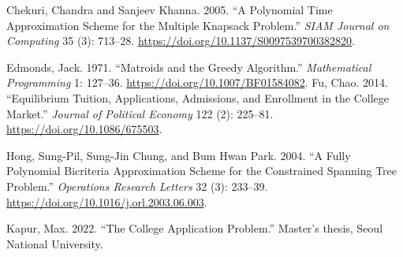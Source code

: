 \documentclass[11pt]{article} %
\theoremstyle{definition}
\begin{document}
Chekuri, Chandra and Sanjeev Khanna. 2005. ``A Polynomial Time Approximation Scheme for the Multiple Knapsack Problem.'' \emph{SIAM Journal on Computing} 35 (3): 713--28. \url{https://doi.org/10.1137/S0097539700382820}.

%
%
%
Edmonds, Jack. 1971. ``Matroids and the Greedy Algorithm.'' \emph{Mathematical Programming} 1: 127--36. \url{https://doi.org/10.1007/BF01584082}.  
%
%
%
Fu, Chao. 2014. ``Equilibrium Tuition, Applications, Admissions, and Enrollment in the College Market.'' \emph{Journal of Political Economy} 122 (2): 225--81. \url{https://doi.org/10.1086/675503}. 

%
%
%
Hong, Sung-Pil, Sung-Jin Chung, and Bum Hwan Park. 2004. ``A Fully Polynomial Bicriteria Approximation Scheme for the Constrained Spanning Tree Problem.'' \emph{Operations Research Letters} 32 (3): 233--39. \url{https://doi.org/10.1016/j.orl.2003.06.003}.

%
%
%
Kapur, Max. 2022. ``The College Application Problem.'' Master's thesis, Seoul National University. 
\end{document}
